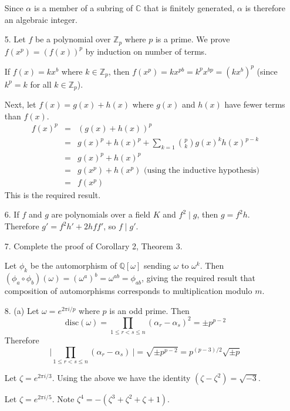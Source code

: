 \documentclass{article}
\newcommand{\w}[0]{\omega}
\newcommand{\z}[0]{\zeta}
\begin{document}
\begin{enumerate}
    Since $\alpha$ is a member of a subring of $\mathbb{C}$ that is finitely generated, $\alpha$ is therefore an algebraic integer.

\item[5.]
    Let $f$ be a polynomial over $\mathbb{Z}_p$ where $p$ is a prime.  We prove $f(x^p) = (f(x))^p$ by induction on number of terms.

    If $f(x) = kx^{b}$ where $k \in \mathbb{Z}_p$, then $f(x^p) = kx^{pb} = k^p x^{bp} = (kx^{b})^p$ (since $k^p = k$ for all $k \in \mathbb{Z}_p$).

    Next, let $f(x) = g(x) + h(x)$ where $g(x)$ and $h(x)$ have fewer terms than $f(x)$.
    \begin{eqnarray*}
        f(x)^p          &=& (g(x) + h(x))^p \\
                        &=& g(x)^p + h(x)^p + \sum_{k = 1} \binom{p}{k} g(x)^{k} h(x)^{p - k} \\
                        &=& g(x)^p + h(x)^p \\
                        &=& g(x^p) + h(x^p) \text{ (using the inductive hypothesis)}\\
                        &=& f(x^p)
    \end{eqnarray*}
    This is the required result.

\item[6.] If $f$ and $g$ are polynomials over a field $K$ and $f^2 \mid g$, then $g = f^2 h$.  Therefore $g' = f^2 h' + 2 h f f'$, so $f \mid g'$.

\item[7.] Complete the proof of Corollary 2, Theorem 3.

Let $\phi_{k}$ be the automorphism of $\mathbb{Q}[\omega]$ sending $\omega$ to $\omega^k$.  Then $(\phi_{a} \circ \phi_{b}) (\omega) = (\omega^{a})^{b} = \omega^{ab} = \phi_{ab}$, giving the required result that composition of automorphisms corresponds to multiplication modulo $m$.

\item[8. (a)] Let $\w = e^{2\pi i/p}$ where $p$ is an odd prime.
Then \[ \text{disc}(\w) = \prod_{1 \le r < s \le n} (\alpha_r - \alpha_s)^2 = \pm p^{p - 2} \]
Therefore \[ \Big\lvert \prod_{1 \le r < s \le n} (\alpha_r - \alpha_s)\ \Big\rvert = \sqrt{\pm p^{p - 2}} = p^{(p - 3) / 2} \sqrt{\pm p} \]

Let $\z = e^{2\pi i /3}$.  Using the above we have the identity $(\z - \z^2) = \sqrt{-3}$.

Let $\z = e^{2\pi i / 5}$.  Note $\z^4 = -(\z^3 + \z^2 + \z + 1)$.


\end{enumerate}
\end{document}
